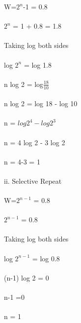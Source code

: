 \documentclass[a4paper,12pt]{article}
\begin{document}
   W=$2^{n}$-1 = 0.8\\\\
   $2^{n}$ = 1 + 0.8 = 1.8\\\\
   Taking log both sides \\\\
   log $2^{n}$ = log 1.8\\\\
   n log 2 = log$\frac{18}{10}$\\\\
   n log 2 = log 18 - log 10 \\\\
   n = $log 2^{4} - log 2^{3}$\\\\
   n = 4 log 2 - 3 log 2 \\\\
   n = 4-3 = 1 \\\\

   ii. Selective Repeat \\\\
   W=$2^{n-1}$ = 0.8\\\\
   $2^{n-1}$ = 0.8 \\\\
   Taking log both sides \\\\
   log $2^{n-1}$ = log 0.8\\\\
   (n-1) log 2 = 0\\\\
   n-1 =0\\\\
   n = 1 \\\\
\end{document}
